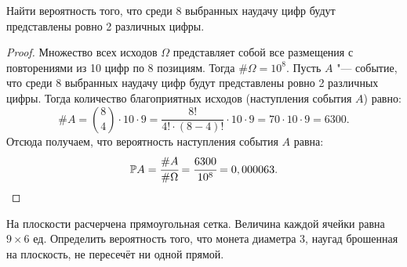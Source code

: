 
\renewcommand*{\proofname}{Решение}

\begin{problem}
Найти вероятность того, что среди 8 выбранных наудачу цифр будут представлены ровно 2 различных цифры.
\end{problem}

\begin{proof}
	Множество всех исходов \(\Omega \) представляет собой все размещения с повторениями из 10 цифр по 8 позициям. Тогда \(\#\Omega = 10^8\). Пусть \(A\) "--- событие, что среди 8 выбранных наудачу цифр будут представлены ровно 2 различных цифры.
	Тогда количество благоприятных исходов (наступления события \(A\)) равно:
	\[
		\#A = \binom{8}{4}\cdot 10 \cdot 9 =   \frac{8!}{4! \cdot (8-4)!} \cdot 10 \cdot 9 = 70 \cdot 10 \cdot 9 = 6300.
	\]
	Отсюда получаем, что вероятность наступления события \(A\) равна:
	\[
		\mathbb P A = \cfrac{\#A}{\#\Omega} = \cfrac{6300}{10^8} = 0,000063.
	\]


\end{proof}

\begin{problem}
На плоскости расчерчена прямоугольная сетка. Величина каждой ячейки равна $9\times6$ ед. Определить вероятность того, что монета диаметра 3, наугад брошенная на плоскость, не пересечёт ни одной прямой.
\end{problem}

